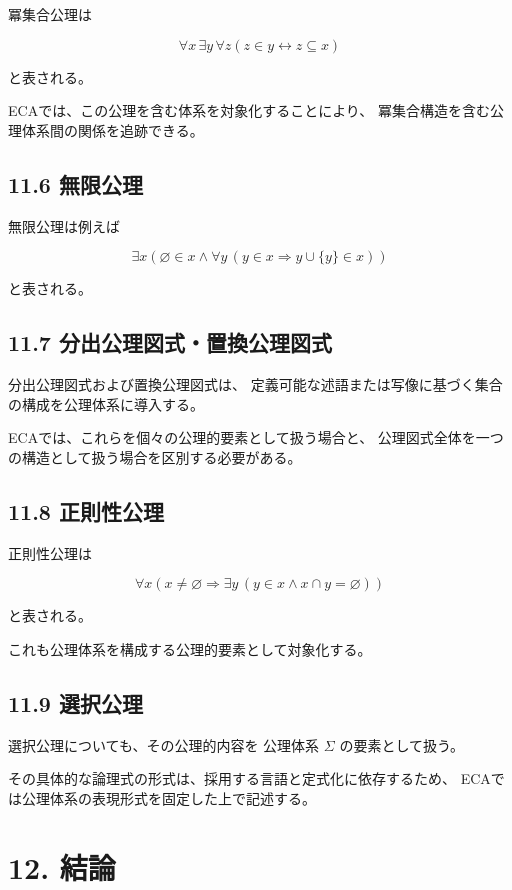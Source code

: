 \documentclass[11pt]{article}
\begin{document}
冪集合公理は

\[
\forall x\,\exists y\,\forall z
\left(
z\in y\leftrightarrow z\subseteq x
\right)
\]

と表される。

ECAでは、この公理を含む体系を対象化することにより、
冪集合構造を含む公理体系間の関係を追跡できる。

\subsection{11.6 無限公理}

無限公理は例えば

\[
\exists x
\left(
\varnothing\in x
\land
\forall y\,
\left(
y\in x\Rightarrow y\cup\{y\}\in x
\right)
\right)
\]

と表される。

\subsection{11.7 分出公理図式・置換公理図式}

分出公理図式および置換公理図式は、
定義可能な述語または写像に基づく集合の構成を公理体系に導入する。

ECAでは、これらを個々の公理的要素として扱う場合と、
公理図式全体を一つの構造として扱う場合を区別する必要がある。

\subsection{11.8 正則性公理}

正則性公理は

\[
\forall x
\left(
x\neq\varnothing
\Rightarrow
\exists y\,
(y\in x\land x\cap y=\varnothing)
\right)
\]

と表される。

これも公理体系を構成する公理的要素として対象化する。

\subsection{11.9 選択公理}

選択公理についても、その公理的内容を
公理体系 $\Sigma$ の要素として扱う。

その具体的な論理式の形式は、採用する言語と定式化に依存するため、
ECAでは公理体系の表現形式を固定した上で記述する。

\section{12. 結論}
\end{document}
